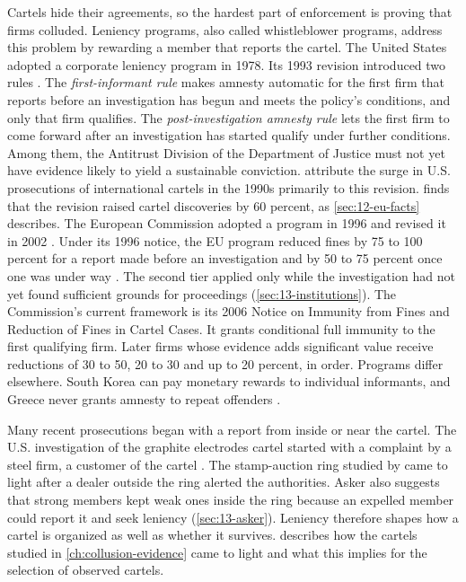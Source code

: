 Cartels hide their agreements, so the hardest part of enforcement is proving that firms colluded. Leniency programs,
also called whistleblower programs, address this problem by rewarding a member that reports the cartel. The United
States adopted a corporate leniency program in 1978. Its 1993 revision introduced two
rules \citep[p.~1]{ChenRey2013}. The \emph{first-informant rule} makes amnesty automatic for the first firm that
reports before an investigation has begun and meets the policy's conditions, and only that firm qualifies. The
\emph{post-investigation amnesty rule} lets the first firm to come forward after an investigation has started qualify
under further conditions. Among them, the Antitrust Division of the Department of Justice must not yet have evidence
likely to yield a sustainable conviction. \citet[p.~50, footnote~21]{LevensteinSuslow2006} attribute the surge in U.S. prosecutions of
international cartels in the 1990s primarily to this revision. \citet{Miller2009} finds that the revision raised
cartel discoveries by 60 percent, as \cref{sec:12-eu-facts} describes. The European Commission adopted a program in
1996 and revised it in 2002 \citep[footnote~1]{ChenRey2013}. Under its 1996 notice, the EU program reduced fines by 75
to 100 percent for a report made before an investigation and by 50 to 75 percent once one was under way
\citep[footnote~6 and p.~29]{ChenRey2013}. The second tier applied only while the investigation had not yet found
sufficient grounds for proceedings (\cref{sec:13-institutions}). The Commission's current framework is its 2006 Notice
on Immunity from Fines and Reduction of Fines in Cartel Cases. It grants conditional full immunity to the first
qualifying firm. Later firms whose evidence adds significant value receive reductions of 30 to 50, 20 to 30 and up to
20 percent, in order. Programs differ elsewhere. South
Korea can pay monetary rewards to individual informants, and Greece never grants amnesty to repeat offenders
\citep[footnote~1 and p.~14]{ChenRey2013}.

Many recent prosecutions began with a report from inside or near the cartel. The U.S. investigation of the graphite
electrodes cartel started with a complaint by a steel firm, a customer of the cartel
\citep[p.~62]{LevensteinSuslow2006}. The stamp-auction ring studied by \citet{Asker2010} came to light after a dealer
outside the ring alerted the authorities. Asker also suggests that strong members kept weak ones inside the ring
because an expelled member could report it and seek leniency (\cref{sec:13-asker}). Leniency therefore shapes how a
cartel is organized as well as whether it survives.  describes how the cartels studied in
\cref{ch:collusion-evidence} came to light and what this implies for the selection of observed cartels.

